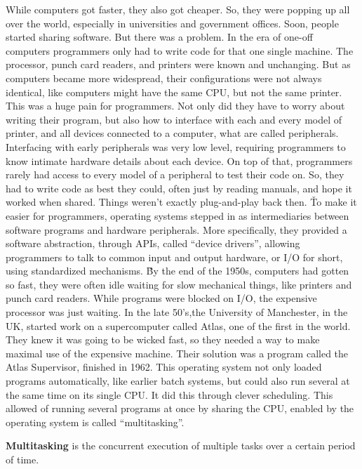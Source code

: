 While computers got faster, they also got cheaper. So, they were popping up all over the world, especially in
universities and government offices. Soon, people started sharing software. But there was a problem. In the era of
one-off computers programmers only had to write code for that one single machine. The processor, punch card readers,
and printers were known and unchanging. But as computers became more widespread, their configurations were not always
identical, like computers might have the same CPU, but not the same printer. This was a huge pain for programmers.
Not only did they have to worry about writing their program, but also how to interface with each and every model of
printer, and all devices connected to a computer, what are called peripherals. Interfacing with early peripherals was
very low level, requiring programmers to know intimate hardware details about each device. On top of that,
programmers rarely had access to every model of a peripheral to test their code on. So, they had to write code as
best they could, often just by reading manuals, and hope it worked when shared. Things weren't exactly plug-and-play
back then. \v

To make it easier for programmers, operating systems stepped in as intermediaries between software programs and
hardware peripherals. More specifically, they provided a software abstraction, through APIs, called ``device drivers'',
allowing programmers to talk to common input and output hardware, or I/O for short, using standardized mechanisms. \v

By the end of the 1950s, computers had gotten so fast, they were often idle waiting for slow mechanical things, like
printers and punch card readers. While programs were blocked on I/O, the expensive processor was just waiting. In the
late 50's,the University of Manchester, in the UK, started work on a supercomputer called Atlas, one of the first in
the world. They knew it was going to be wicked fast, so they needed a way to make maximal use of the expensive
machine. Their solution was a program called the Atlas Supervisor, finished in 1962. This operating system not only
loaded programs automatically, like earlier batch systems, but could also run several at the same time on its single
CPU. It did this through clever scheduling. This allowed of running several programs at once by sharing the CPU,
enabled by the operating system is called ``multitasking''.

\bd[Multitasking]
\textbf{Multitasking} is the concurrent execution of multiple tasks over a certain period of time.
\ed

